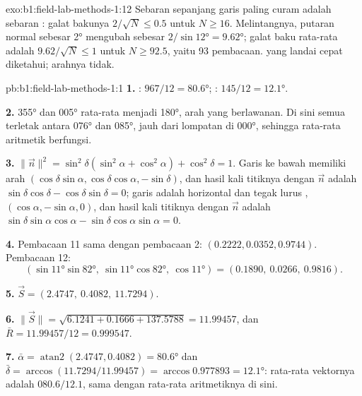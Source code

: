 \begin{solution}{exo:b1:field-lab-methods-1:12}
Sebaran sepanjang garis  paling curam adalah sebaran : galat bakunya $2/\sqrt N \le 0.5$ untuk $N \ge 16$. Melintangnya, putaran normal sebesar \ang{2} mengubah  sebesar $2/\sin\ang{12} = \ang{9.62}$; galat baku  rata-rata adalah $9.62/\sqrt N \le 1$ untuk $N \ge 92.5$, yaitu 93 pembacaan.  yang landai cepat diketahui; arahnya tidak.
\end{solution}

\begin{solution}{pb:b1:field-lab-methods-1:1}
\textbf{1.} : $967/12 = \ang{80.6}$; : $145/12 =
\ang{12.1}$.

\textbf{2.} \ang{355} dan \ang{005} rata-rata menjadi \ang{180}, arah yang berlawanan. Di sini semua  terletak antara \ang{076} dan \ang{085}, jauh dari lompatan di \ang{000}, sehingga rata-rata aritmetik berfungsi.

\textbf{3.} $\|\vec n\|^2 = \sin^2\delta(\sin^2\alpha + \cos^2\alpha) +
\cos^2\delta = 1$. Garis  ke bawah memiliki arah
$(\cos\delta\sin\alpha, \cos\delta\cos\alpha, -\sin\delta)$, dan hasil kali titiknya dengan $\vec n$ adalah $\sin\delta\cos\delta - \cos\delta\sin\delta = 0$; garis  adalah horizontal dan tegak lurus ,
$(\cos\alpha, -\sin\alpha, 0)$, dan hasil kali titiknya dengan $\vec n$ adalah
$\sin\delta\sin\alpha\cos\alpha - \sin\delta\cos\alpha\sin\alpha = 0$.

\textbf{4.} Pembacaan 11 sama dengan pembacaan 2: $(0.2222, 0.0352, 0.9744)$.
Pembacaan 12:
\[
  (\sin\ang{11}\sin\ang{82},\ \sin\ang{11}\cos\ang{82},\ \cos\ang{11}) =
  (0.1890,\ 0.0266,\ 0.9816).
\]

\textbf{5.} $\vec S = (2.4747,\ 0.4082,\ 11.7294)$.

\textbf{6.} $\|\vec S\| = \sqrt{6.1241 + 0.1666 + 137.5788} = 11.99457$, dan
$\bar R = 11.99457/12 = 0.999547$.

\textbf{7.} $\bar\alpha = \operatorname{atan2}(2.4747, 0.4082) = \ang{80.6}$
dan $\bar\delta = \arccos(11.7294/11.99457) = \arccos 0.977893 = \ang{12.1}$:
rata-rata vektornya adalah $080.6/12.1$, sama dengan rata-rata aritmetiknya di sini.


\end{solution}
